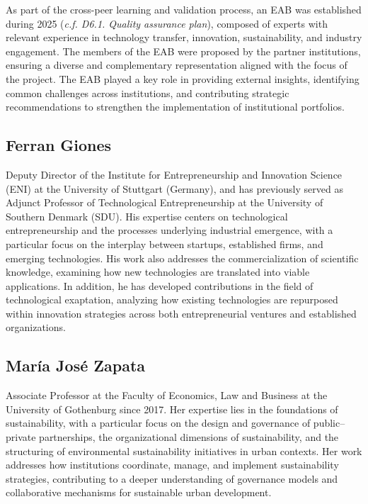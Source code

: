 \documentclass[
  12pt,
  oneside]{book}
\begin{document}
As part of the cross-peer learning and validation process, an EAB was
established during 2025 (\emph{c.f. D6.1. Quality assurance plan}),
composed of experts with relevant experience in technology transfer,
innovation, sustainability, and industry engagement. The members of the
EAB were proposed by the partner institutions, ensuring a diverse and
complementary representation aligned with the focus of the project. The
EAB played a key role in providing external insights, identifying common
challenges across institutions, and contributing strategic
recommendations to strengthen the implementation of institutional
portfolios.

\subsection{Ferran Giones}\label{ferran-giones}

Deputy Director of the Institute for Entrepreneurship and Innovation
Science (ENI) at the University of Stuttgart (Germany), and has
previously served as Adjunct Professor of Technological Entrepreneurship
at the University of Southern Denmark (SDU). His expertise centers on
technological entrepreneurship and the processes underlying industrial
emergence, with a particular focus on the interplay between startups,
established firms, and emerging technologies. His work also addresses
the commercialization of scientific knowledge, examining how new
technologies are translated into viable applications. In addition, he
has developed contributions in the field of technological exaptation,
analyzing how existing technologies are repurposed within innovation
strategies across both entrepreneurial ventures and established
organizations.

\subsection{María José Zapata}\label{maruxeda-josuxe9-zapata}

Associate Professor at the Faculty of Economics, Law and Business at the
University of Gothenburg since 2017. Her expertise lies in the
foundations of sustainability, with a particular focus on the design and
governance of public--private partnerships, the organizational
dimensions of sustainability, and the structuring of environmental
sustainability initiatives in urban contexts. Her work addresses how
institutions coordinate, manage, and implement sustainability
strategies, contributing to a deeper understanding of governance models
and collaborative mechanisms for sustainable urban development.
\end{document}
